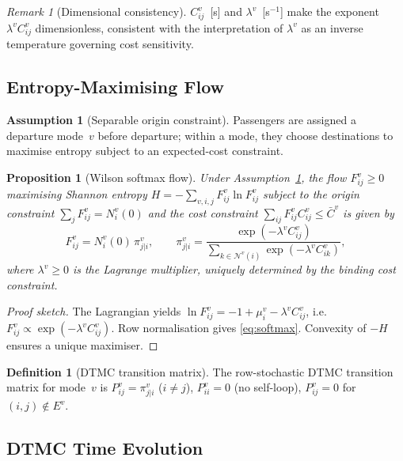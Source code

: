 \documentclass[11pt,a4paper]{article}
\theoremstyle{plain}
\newtheorem{proposition}[theorem]{Proposition}
\theoremstyle{definition}
\newtheorem{definition}[theorem]{Definition}
\newtheorem{assumption}[theorem]{Assumption}
\theoremstyle{remark}
\newtheorem{remark}[theorem]{Remark}
\begin{document}
\begin{remark}[Dimensional consistency]
$C^v_{ij}$~[s] and $\lambda^v$~[s$^{-1}$] make the exponent
$\lambda^v C^v_{ij}$ dimensionless, consistent with the interpretation of
$\lambda^v$ as an inverse temperature governing cost sensitivity.
\end{remark}

\subsection{Entropy-Maximising Flow}

\begin{assumption}[Separable origin constraint]
\label{ass:origin}
Passengers are assigned a departure mode~$v$ before departure; within a mode,
they choose destinations to maximise entropy subject to an expected-cost
constraint.
\end{assumption}

\begin{proposition}[Wilson softmax flow]
Under Assumption~\ref{ass:origin}, the flow $F^v_{ij}\ge0$ maximising Shannon
entropy $H=-\sum_{v,i,j}F^v_{ij}\ln F^v_{ij}$ subject to the origin
constraint $\sum_j F^v_{ij}=N^v_i(0)$ and the cost constraint
$\sum_{ij}F^v_{ij}C^v_{ij}\le\bar{C}^v$ is given by
\begin{equation}
  F^v_{ij} = N^v_i(0)\,\pi^v_{j|i},\qquad
  \pi^v_{j|i} = \frac{\exp(-\lambda^v C^v_{ij})}
    {\displaystyle\sum_{k\in\mathcal{N}^v(i)}\exp(-\lambda^v C^v_{ik})},
  \label{eq:softmax}
\end{equation}
where $\lambda^v\ge0$ is the Lagrange multiplier, uniquely determined by the
binding cost constraint.
\end{proposition}

\begin{proof}[Proof sketch]
The Lagrangian yields $\ln F^v_{ij}=-1+\mu^v_i-\lambda^v C^v_{ij}$, i.e.\
$F^v_{ij}\propto\exp(-\lambda^v C^v_{ij})$.  Row normalisation gives
\eqref{eq:softmax}.  Convexity of $-H$ ensures a unique maximiser.
\end{proof}

\begin{definition}[DTMC transition matrix]
\label{def:dtmc}
The row-stochastic DTMC transition matrix for mode~$v$ is
$P^v_{ij}=\pi^v_{j|i}$ ($i\ne j$), $P^v_{ii}=0$ (no self-loop),
$P^v_{ij}=0$ for $(i,j)\notin E^v$.
\end{definition}

\subsection{DTMC Time Evolution}
\end{document}
